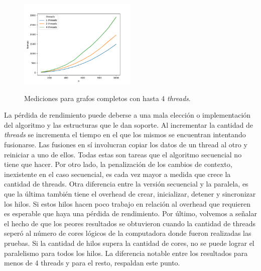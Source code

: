 \begin{figure}[h]
\caption{Mediciones para grafos completos con hasta 4 \textit{threads}.}
\centering
\includegraphics[width=0.5\textwidth]{imagenes/completo-124.png} \\%
\label{fig:completos124}
\end{figure}

La pérdida de rendimiento puede deberse a una mala elección o implementación
del algoritmo y las estructuras que le dan soporte. Al incrementar la 
cantidad de \textit{threads} se incrementa el tiempo en el que los mismos se
 encuentran intentando fusionarse. Las fusiones en sí involucran copiar los 
 datos de un thread al otro y reiniciar a uno de ellos. Todas estas son tareas 
 que el algoritmo secuencial no tiene que hacer. Por otro lado, la penalización
  de los cambios de contexto, inexistente en el caso secuencial, es cada vez 
  mayor a medida que crece la cantidad de threads.
  Otra diferencia entre la versión secuencial y la paralela, es que la última 
  también tiene el overhead de crear, inicializar, detener y sincronizar los 
  hilos. Si estos hilos hacen poco trabajo en relación al overhead que 
  requieren es esperable que haya una pérdida de rendimiento. Por último, 
  volvemos a señalar el hecho de que los peores resultados se obtuvieron 
  cuando la cantidad de threads seperó al número de cores lógicos de la 
  computadora donde fueron realizadas las pruebas. Si la cantidad de hilos 
  supera la cantidad de cores, no se puede lograr el paralelismo para todos 
  los hilos. La diferencia notable entre los resultados para menos de 4 threads
   y para el resto, respaldan este punto.
